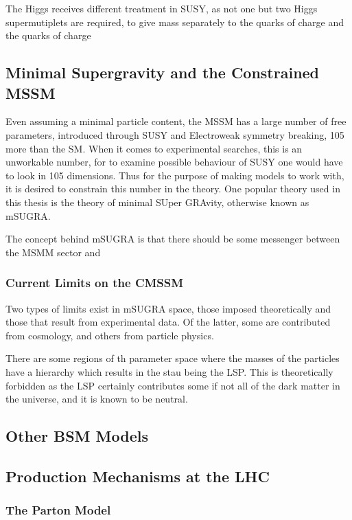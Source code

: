 The Higgs receives different treatment in SUSY, as not one but two Higgs supermutiplets are required, to give mass separately to the quarks of charge  and the quarks of charge 



\subsection{Minimal Supergravity and the Constrained MSSM}

Even assuming a minimal particle content, the MSSM has a large number of free parameters, introduced through SUSY and Electroweak symmetry breaking, 105 more than the SM. When it comes to experimental searches, this is an unworkable number, for to examine possible behaviour of SUSY one would have to look in 105 dimensions. Thus for the purpose of making models to work with, it is desired to constrain this number in the theory. One popular theory used in this thesis is the theory of minimal SUper GRAvity, otherwise known as mSUGRA. 

The concept behind mSUGRA is that there should be some messenger between the MSMM sector and 

\subsubsection{Current Limits on the CMSSM}

Two types of limits exist in mSUGRA space, those imposed theoretically and those that result from experimental data. Of the latter, some are contributed from cosmology, and others from particle physics. 

There are some regions of th parameter space where the masses of the particles have a hierarchy which results in the stau being the LSP. This is theoretically forbidden as the LSP certainly contributes some if not all of the dark matter in the universe, and it is known to be neutral. 



\subsection{Other BSM Models}
\subsection{Production Mechanisms at the LHC}
\subsubsection{The Parton Model}



